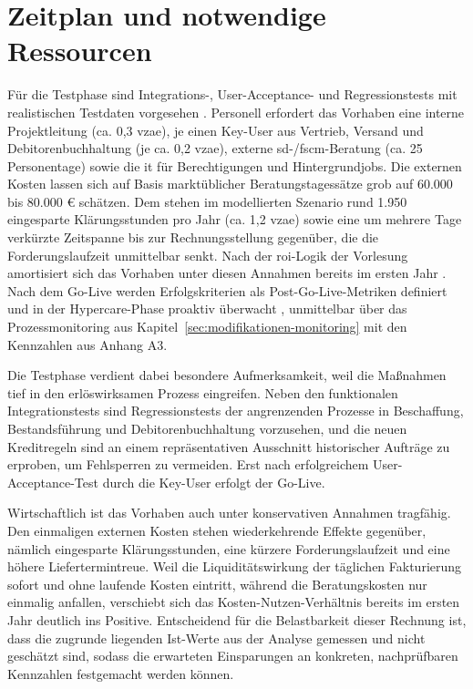 \section{Zeitplan und notwendige Ressourcen}\label{sec:zeitplan-ressourcen}

Für die Testphase sind Integrations-, User-Acceptance- und Regressionstests mit realistischen Testdaten vorgesehen \parencite[Folie~333 und 335]{coletta2026_0206}. Personell erfordert das Vorhaben eine interne Projektleitung (ca. 0,3 \gls{vzae}), je einen Key-User aus Vertrieb, Versand und Debitorenbuchhaltung (je ca. 0,2 \gls{vzae}), externe \gls{sd}-/\gls{fscm}-Beratung (ca. 25 Personentage) sowie die \gls{it} für Berechtigungen und Hintergrundjobs. Die externen Kosten lassen sich auf Basis marktüblicher Beratungstagessätze grob auf 60.000 bis 80.000 \euro{} schätzen. Dem stehen im modellierten Szenario rund 1.950 eingesparte Klärungsstunden pro Jahr (ca. 1,2 \gls{vzae}) sowie eine um mehrere Tage verkürzte Zeitspanne bis zur Rechnungsstellung gegenüber, die die Forderungslaufzeit unmittelbar senkt. Nach der \gls{roi}-Logik der Vorlesung amortisiert sich das Vorhaben unter diesen Annahmen bereits im ersten Jahr \parencites[Folie~343 ff.]{coletta2026_0206}[Folie~386 ff.]{coletta2026_0906}. Nach dem Go-Live werden Erfolgskriterien als Post-Go-Live-Metriken definiert und in der Hypercare-Phase proaktiv überwacht \parencite[Folie~337 und 341]{coletta2026_0206}, unmittelbar über das Prozessmonitoring aus Kapitel~\ref{sec:modifikationen-monitoring} mit den Kennzahlen aus Anhang A3.

Die Testphase verdient dabei besondere Aufmerksamkeit, weil die Maßnahmen tief in den erlöswirksamen Prozess eingreifen. Neben den funktionalen Integrationstests sind Regressionstests der angrenzenden Prozesse in Beschaffung, Bestandsführung und Debitorenbuchhaltung vorzusehen, und die neuen Kreditregeln sind an einem repräsentativen Ausschnitt historischer Aufträge zu erproben, um Fehlsperren zu vermeiden. Erst nach erfolgreichem User-Acceptance-Test durch die Key-User erfolgt der Go-Live.

Wirtschaftlich ist das Vorhaben auch unter konservativen Annahmen tragfähig. Den einmaligen externen Kosten stehen wiederkehrende Effekte gegenüber, nämlich eingesparte Klärungsstunden, eine kürzere Forderungslaufzeit und eine höhere Liefertermintreue. Weil die Liquiditätswirkung der täglichen Fakturierung sofort und ohne laufende Kosten eintritt, während die Beratungskosten nur einmalig anfallen, verschiebt sich das Kosten-Nutzen-Verhältnis bereits im ersten Jahr deutlich ins Positive. Entscheidend für die Belastbarkeit dieser Rechnung ist, dass die zugrunde liegenden Ist-Werte aus der Analyse gemessen und nicht geschätzt sind, sodass die erwarteten Einsparungen an konkreten, nachprüfbaren Kennzahlen festgemacht werden können.

